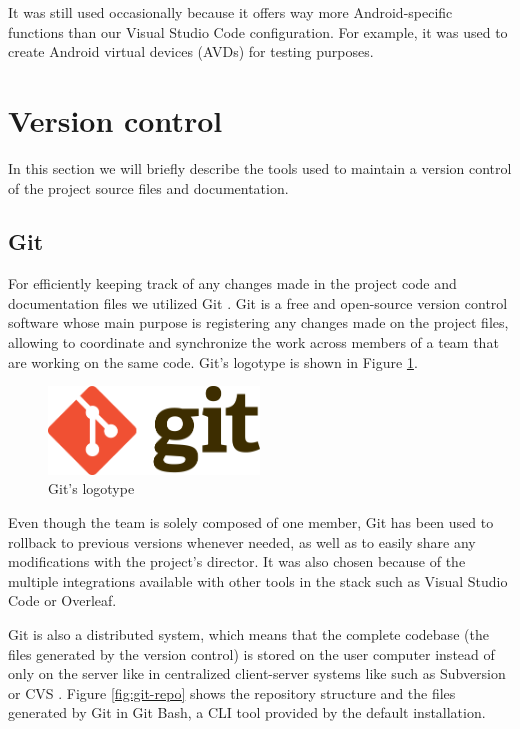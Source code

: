It was still used occasionally because it offers way more Android-specific functions than our Visual Studio Code configuration. For example, it was used to create Android virtual devices (AVDs) for testing purposes.

\section{Version control}

In this section we will briefly describe the tools used to maintain a version control of the project source files and documentation.

\subsection{Git}

For efficiently keeping track of any changes made in the project code and documentation files we utilized Git \cite{noauthor_git_2021}. Git is a free and open-source version control software whose main purpose is registering any changes made on the project files, allowing to coordinate and synchronize the work across members of a team that are working on the same code. Git's logotype is shown in Figure \ref{fig:git}.

\begin{figure}[h]
  \centering
  \includegraphics[width=0.5\textwidth]{Figures/git-logo.png}
  \caption{%
    Git's logotype
  }
  \label{fig:git}
\end{figure}

Even though the team is solely composed of one member, Git has been used to rollback to previous versions whenever needed, as well as to easily share any modifications with the project's director. It was also chosen because of the multiple integrations available with other tools in the stack such as Visual Studio Code or Overleaf. 

Git is also a distributed system, which means that the complete codebase (the files generated by the version control) is stored on the user computer instead of only on the server like in centralized client-server systems like such as Subversion \cite{noauthor_apache_nodate} or CVS \cite{noauthor_cvs_nodate}. Figure \ref{fig:git-repo} shows the repository structure and the files generated by Git in Git Bash, a CLI tool provided by the default installation.

